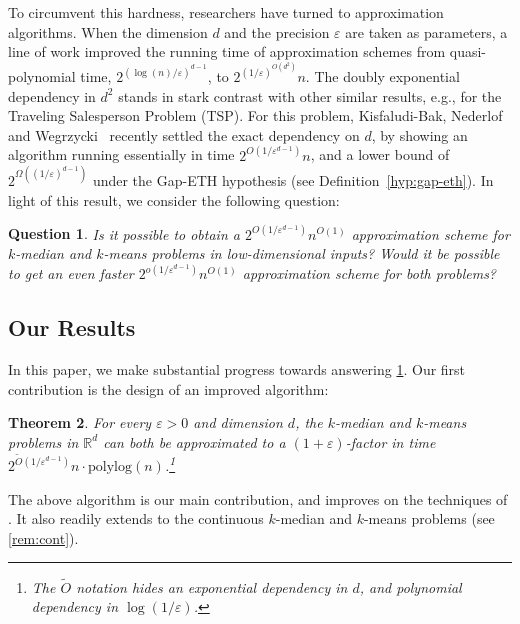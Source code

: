 \documentclass[11pt]{article}
\newtheorem{theorem}{Theorem}[section]
\newtheorem{question}[theorem]{Question}
\newcommand{\R}{\mathbb R}
\newcommand{\eps}{\varepsilon}
\newcommand{\polylog}{\mathrm{ polylog}}
\renewcommand{\tilde}{\widetilde}
\newcommand{\lpar}{\left(}
\newcommand{\rpar}{\right)}
\begin{document}
To circumvent this hardness, researchers have turned to approximation algorithms. When the dimension $d$ and the precision $\eps$ are taken as parameters, a line of work \cite{AroraRR98, KolliopoulosR07, FriggstadRS19, Cohen-AddadKM19, Cohen-Addad18, jacm} improved the running time of approximation schemes from quasi-polynomial time, $2^{(\log(n)/\eps)^{d-1}}$, to  $2^{(1/\eps)^{O(d^2)}} n$. 
The doubly exponential dependency in $d^2$ stands in stark contrast with other similar results, e.g., for the Traveling Salesperson Problem (TSP). 
For this problem, Kisfaludi-Bak, Nederlof and Wegrzycki~\cite{Kisfaludi-BakNW21} recently settled the exact dependency on $d$, by showing an algorithm running essentially in time $2^{O\lpar 1/\eps^{d-1}\rpar} n$, and a lower bound of $2^{\Omega\lpar (1/\eps)^{d-1}\rpar}$ under the Gap-ETH hypothesis \cite{D16,MR16} (see Definition~\ref{hyp:gap-eth}). 
In light of this result, we consider the following question:


\begin{question}\label{q:approx}
Is it possible to obtain a $2^{O\lpar 1/\eps^{d-1}\rpar} n^{O(1)}$ approximation scheme for $k$-median and $k$-means problems in low-dimensional inputs? Would it be possible to get an even faster $2^{o\lpar 1/\eps^{d-1}\rpar} n^{O(1)}$ approximation scheme for both problems?
\end{question}



\subsection{Our Results}
In this paper, we make substantial progress towards answering \cref{q:approx}. Our first contribution is the design of an improved algorithm:


\begin{theorem}\label{thm:mainAlgo}
    For every $\eps > 0$ and dimension $d$, the $k$-median and $k$-means problems in $\R^d$ can both be  approximated to a $(1+\eps)$-factor in time $2^{\tilde O\lpar 1/\eps^{d-1}\rpar} n \cdot \polylog(n)$.\footnote{The $\tilde O$ notation hides an exponential dependency in $d$, and polynomial dependency in $\log(1/\eps)$.}
\end{theorem}


The above algorithm is our main contribution, and improves on the techniques of \cite{jacm}. It also readily extends to the continuous $k$-median and $k$-means problems (see \cref{rem:cont}). 
\end{document}
